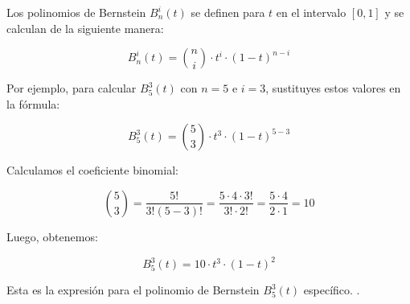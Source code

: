 \begin{frame}
    \begin{solution}
       Los polinomios de Bernstein $B_{n}^{i}(t)$ se definen para $t$ en el intervalo $[0, 1]$ y se calculan de la siguiente manera:

\[B_{n}^{i}(t) = \binom{n}{i} \cdot t^i \cdot (1 - t)^{n - i}\]

Por ejemplo, para calcular $B_{5}^{3}(t)$ con $n = 5$ e $i = 3$, sustituyes estos valores en la fórmula:

\[B_{5}^{3}(t) = \binom{5}{3} \cdot t^3 \cdot (1 - t)^{5 - 3}\]

Calculamos el coeficiente binomial:

\[\binom{5}{3} = \frac{5!}{3!(5-3)!} = \frac{5 \cdot 4 \cdot 3!}{3! \cdot 2!} = \frac{5 \cdot 4}{2 \cdot 1} = 10\]

Luego, obtenemos:

\[B_{5}^{3}(t) = 10 \cdot t^3 \cdot (1 - t)^2\]

Esta es la expresión para el polinomio de Bernstein $B_{5}^{3}(t)$ específico.
 .
    \end{solution}
\end{frame}